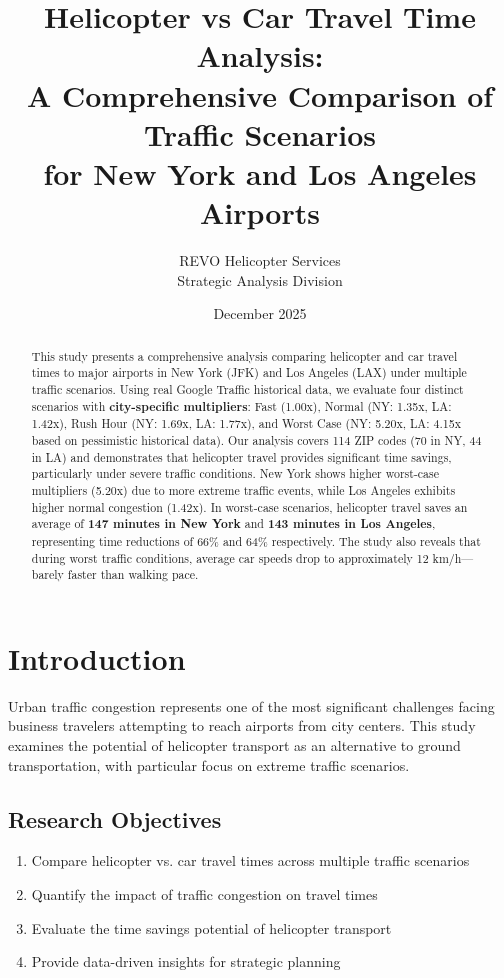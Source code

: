 \documentclass[12pt,a4paper]{article}
\title{\textbf{Helicopter vs Car Travel Time Analysis:\\
A Comprehensive Comparison of Traffic Scenarios\\
for New York and Los Angeles Airports}}
\author{REVO Helicopter Services\\
Strategic Analysis Division}
\date{December 2025}
\begin{document}
\maketitle

\begin{abstract}
This study presents a comprehensive analysis comparing helicopter and car travel times to major airports in New York (JFK) and Los Angeles (LAX) under multiple traffic scenarios. Using real Google Traffic historical data, we evaluate four distinct scenarios with \textbf{city-specific multipliers}: Fast (1.00x), Normal (NY: 1.35x, LA: 1.42x), Rush Hour (NY: 1.69x, LA: 1.77x), and Worst Case (NY: 5.20x, LA: 4.15x based on pessimistic historical data). Our analysis covers 114 ZIP codes (70 in NY, 44 in LA) and demonstrates that helicopter travel provides significant time savings, particularly under severe traffic conditions. New York shows higher worst-case multipliers (5.20x) due to more extreme traffic events, while Los Angeles exhibits higher normal congestion (1.42x). In worst-case scenarios, helicopter travel saves an average of \textbf{147 minutes in New York} and \textbf{143 minutes in Los Angeles}, representing time reductions of 66\% and 64\% respectively. The study also reveals that during worst traffic conditions, average car speeds drop to approximately 12 km/h---barely faster than walking pace.
\end{abstract}

\newpage
\tableofcontents
\newpage

\section{Introduction}

Urban traffic congestion represents one of the most significant challenges facing business travelers attempting to reach airports from city centers. This study examines the potential of helicopter transport as an alternative to ground transportation, with particular focus on extreme traffic scenarios.

\subsection{Research Objectives}

\begin{enumerate}
    \item Compare helicopter vs. car travel times across multiple traffic scenarios
    \item Quantify the impact of traffic congestion on travel times
    \item Evaluate the time savings potential of helicopter transport
    \item Provide data-driven insights for strategic planning
\end{enumerate}
\end{document}
